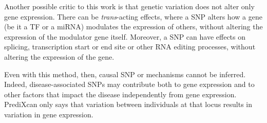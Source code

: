 \documentclass[../main.tex]{subfiles}
\begin{document}
Another possible critic to this work is that genetic variation does not 
alter only gene expression. There can be \textit{trans}-acting effects, 
where a SNP alters how a gene (be it a TF or a miRNA) modulates the 
expression of others, without altering the expression of the modulator 
gene itself. Moreover, a SNP can have effects on splicing, transcription 
start or end site or other RNA editing processes, without altering the 
expression of the gene.

Even with this method, then, causal SNP or mechanisms cannot be 
inferred. Indeed, disease-associated SNPs may contribute both to gene 
expression and to other factors that impact the disease independently 
from gene expression. PrediXcan  only says that variation between 
individuals at that locus results in variation in gene 
expression.
\end{document}
